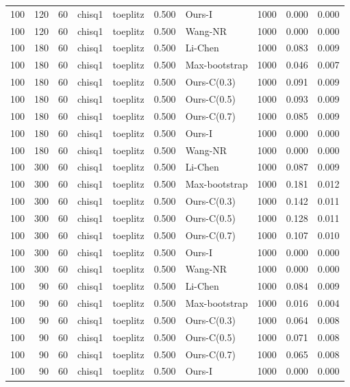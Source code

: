 \begin{tabular}{rrrllrlrrr}
100 & 120 & 60 & chisq1 & toeplitz & 0.500 & Ours-I & 1000 & 0.000 & 0.000 \\
100 & 120 & 60 & chisq1 & toeplitz & 0.500 & Wang-NR & 1000 & 0.000 & 0.000 \\
100 & 180 & 60 & chisq1 & toeplitz & 0.500 & Li-Chen & 1000 & 0.083 & 0.009 \\
100 & 180 & 60 & chisq1 & toeplitz & 0.500 & Max-bootstrap & 1000 & 0.046 & 0.007 \\
100 & 180 & 60 & chisq1 & toeplitz & 0.500 & Ours-C(0.3) & 1000 & 0.091 & 0.009 \\
100 & 180 & 60 & chisq1 & toeplitz & 0.500 & Ours-C(0.5) & 1000 & 0.093 & 0.009 \\
100 & 180 & 60 & chisq1 & toeplitz & 0.500 & Ours-C(0.7) & 1000 & 0.085 & 0.009 \\
100 & 180 & 60 & chisq1 & toeplitz & 0.500 & Ours-I & 1000 & 0.000 & 0.000 \\
100 & 180 & 60 & chisq1 & toeplitz & 0.500 & Wang-NR & 1000 & 0.000 & 0.000 \\
100 & 300 & 60 & chisq1 & toeplitz & 0.500 & Li-Chen & 1000 & 0.087 & 0.009 \\
100 & 300 & 60 & chisq1 & toeplitz & 0.500 & Max-bootstrap & 1000 & 0.181 & 0.012 \\
100 & 300 & 60 & chisq1 & toeplitz & 0.500 & Ours-C(0.3) & 1000 & 0.142 & 0.011 \\
100 & 300 & 60 & chisq1 & toeplitz & 0.500 & Ours-C(0.5) & 1000 & 0.128 & 0.011 \\
100 & 300 & 60 & chisq1 & toeplitz & 0.500 & Ours-C(0.7) & 1000 & 0.107 & 0.010 \\
100 & 300 & 60 & chisq1 & toeplitz & 0.500 & Ours-I & 1000 & 0.000 & 0.000 \\
100 & 300 & 60 & chisq1 & toeplitz & 0.500 & Wang-NR & 1000 & 0.000 & 0.000 \\
100 & 90 & 60 & chisq1 & toeplitz & 0.500 & Li-Chen & 1000 & 0.084 & 0.009 \\
100 & 90 & 60 & chisq1 & toeplitz & 0.500 & Max-bootstrap & 1000 & 0.016 & 0.004 \\
100 & 90 & 60 & chisq1 & toeplitz & 0.500 & Ours-C(0.3) & 1000 & 0.064 & 0.008 \\
100 & 90 & 60 & chisq1 & toeplitz & 0.500 & Ours-C(0.5) & 1000 & 0.071 & 0.008 \\
100 & 90 & 60 & chisq1 & toeplitz & 0.500 & Ours-C(0.7) & 1000 & 0.065 & 0.008 \\
100 & 90 & 60 & chisq1 & toeplitz & 0.500 & Ours-I & 1000 & 0.000 & 0.000 \\

\end{tabular}
